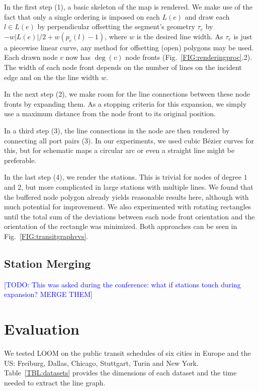 \documentclass[sigconf]{acmart}
\newcommand\TODO[1]{\textcolor{blue}{\small [TODO: #1]}}
\begin{document}
In the first step (1), a basic skeleton of the map is rendered. We make use of the fact that only a single ordering is imposed on each $L(e)$ and draw each $l \in L(e)$ by perpendicular offsetting the segment's geometry $\tau_{e}$ by $-w\left|L(e)\right|/2 + w\left(p_{e}(l)-1\right)$, where $w$ is the desired line width. As $\tau_{e}$ is just a piecewise linear curve, any method for offsetting (open) polygons may be used. Each drawn node $v$ now has $\deg(v)$ node fronts (Fig.~\ref{FIG:renderingproc}.2). The width of each node front depends on the number of lines on the incident edge and on the the line width $w$. 

In the next step (2), we make room for the line connections between these node fronts by expanding them. As a stopping criteria for this expansion, we simply use a maximum distance from the node front to its original position. 

In a third step (3), the line connections in the node are then rendered by connecting all port pairs (3). In our experiments, we used cubic B\'ezier curves for this, but for schematic maps a circular arc or even a straight line might be preferable.

In the last step (4), we render the stations. This is trivial for nodes of degree $1$ and $2$, but more complicated in large stations with multiple lines. We found that the buffered node polygon already yields reasonable results here, although with much potential for improvement. We also experimented with rotating rectangles until the total sum of the deviations between each node front orientation and the orientation of the rectangle was minimized. Both approaches can be seen in Fig.~\ref{FIG:transitgraphvvs}.

\subsection{Station Merging}

\TODO{This was asked during the conference: what if stations touch during expansion? MERGE THEM}

\section{Evaluation}\label{SEC:eval}
%
\def\degv{\text{deg}(v)}
\def\Hms{\makebox[1.6mm][l]{\hspace{0.2mm}\footnotesize ms}}
\def\Hs{\makebox[1.6mm][l]{\hspace{0.2mm}\footnotesize s}}
\def\Hk{\makebox[1.6mm][l]{\hspace{0.2mm}\footnotesize k}}
\def\Hm{\makebox[1.6mm][l]{\hspace{0.2mm}\footnotesize m}}
\def\Hh{\makebox[1.6mm][l]{\hspace{0.2mm}\footnotesize h}}
\def\Hhline{\\[.7mm]\hline}
We tested LOOM on the public transit schedules of six cities in Europe and the US: Freiburg, Dallas, Chicago, Stuttgart, Turin and New York.
Table~\ref{TBL:datasets} provides the dimensions of each dataset and the time needed to extract the line graph.
\end{document}

